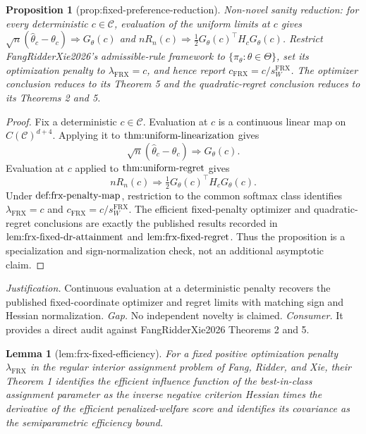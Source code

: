 \documentclass{article}
\newtheorem{lemma}{Lemma}
\newtheorem{proposition}{Proposition}
\begin{document}
\begin{proposition}[prop:fixed-preference-reduction]\label{prop:fixed-preference-reduction}
Non-novel sanity reduction: for every deterministic \(c\in\mathcal C\), evaluation of the uniform limits at \(c\) gives \(\sqrt n(\widehat\theta_c-\theta_c)\Rightarrow G_\theta(c)\) and \(nR_n(c)\Rightarrow\tfrac12G_\theta(c)^\top H_cG_\theta(c)\). Restrict FangRidderXie2026's admissible-rule framework to \(\{\pi_\theta:\theta\in\Theta\}\), set its optimization penalty to \(\lambda_{\mathrm{FRX}}=c\), and hence report \(c_{\mathrm{FRX}}=c/s_W^{\mathrm{FRX}}\). The optimizer conclusion reduces to its Theorem 5 and the quadratic-regret conclusion reduces to its Theorems 2 and 5.
\end{proposition}
\begin{proof}
Fix a deterministic \(c\in\mathcal C\). Evaluation at \(c\) is a continuous linear map on \(C(\mathcal C)^{d+4}\). Applying it to \(\textnormal{thm:uniform-linearization}\) gives
\[
 \sqrt n(\widehat\theta_c-\theta_c)\Rightarrow G_\theta(c).
\]
Evaluation at \(c\) applied to \(\textnormal{thm:uniform-regret}\) gives
\[
 nR_n(c)\Rightarrow\tfrac12G_\theta(c)^\top H_cG_\theta(c).
\]
Under \(\textnormal{def:frx-penalty-map}\), restriction to the common softmax class identifies \(\lambda_{\mathrm{FRX}}=c\) and \(c_{\mathrm{FRX}}=c/s_W^{\mathrm{FRX}}\). The efficient fixed-penalty optimizer and quadratic-regret conclusions are exactly the published results recorded in \(\textnormal{lem:frx-fixed-dr-attainment}\) and \(\textnormal{lem:frx-fixed-regret}\). Thus the proposition is a specialization and sign-normalization check, not an additional asymptotic claim.
\end{proof}
\par\smallskip\noindent \textit{Justification.} Continuous evaluation at a deterministic penalty recovers the published fixed-coordinate optimizer and regret limits with matching sign and Hessian normalization. \textit{Gap.} No independent novelty is claimed. \textit{Consumer.} It provides a direct audit against FangRidderXie2026 Theorems 2 and 5.

\begin{lemma}[lem:frx-fixed-efficiency]\label{lem:frx-fixed-efficiency}
For a fixed positive optimization penalty \(\lambda_{\mathrm{FRX}}\) in the regular interior assignment problem of Fang, Ridder, and Xie, their Theorem 1 identifies the efficient influence function of the best-in-class assignment parameter as the inverse negative criterion Hessian times the derivative of the efficient penalized-welfare score and identifies its covariance as the semiparametric efficiency bound.
\end{lemma}
\end{document}
